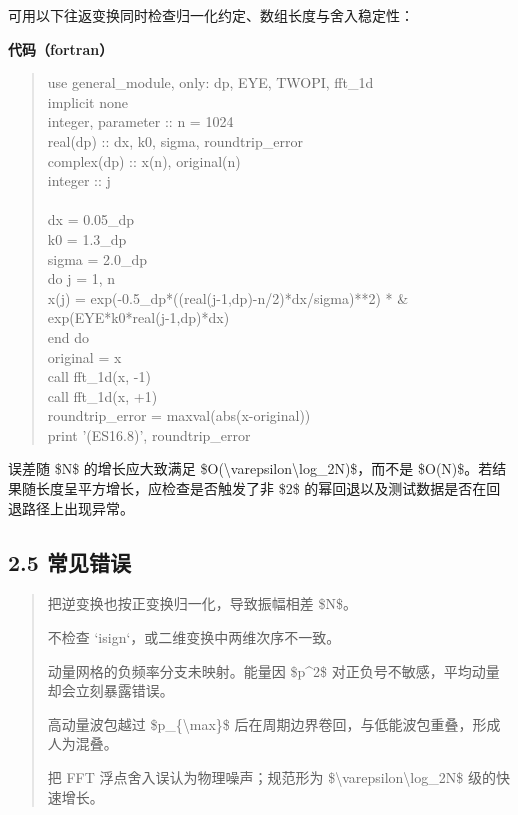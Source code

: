 \documentclass[UTF8,openany,11pt,fontset=fandol]{ctexbook}
\begin{document}
可用以下往返变换同时检查归一化约定、数组长度与舍入稳定性：

\textbf{代码（fortran）}

\begin{quote}
use general\_module, only: dp, EYE, TWOPI, fft\_1d\\
implicit none\\
integer, parameter :: n = 1024\\
real(dp) :: dx, k0, sigma, roundtrip\_error\\
complex(dp) :: x(n), original(n)\\
integer :: j\\
~\\
dx = 0.05\_dp\\
k0 = 1.3\_dp\\
sigma = 2.0\_dp\\
do j = 1, n\\
x(j) = exp(-0.5\_dp*((real(j-1,dp)-n/2)*dx/sigma)**2) * \&\\
exp(EYE*k0*real(j-1,dp)*dx)\\
end do\\
original = x\\
call fft\_1d(x, -1)\\
call fft\_1d(x, +1)\\
roundtrip\_error = maxval(abs(x-original))\\
print '(ES16.8)', roundtrip\_error
\end{quote}

误差随 \$N\$ 的增长应大致满足
\$O(\textbackslash varepsilon\textbackslash log\_2N)\$，而不是
\$O(N)\$。若结果随长度呈平方增长，应检查是否触发了非 \$2\$
的幂回退以及测试数据是否在回退路径上出现异常。

\subsection{\texorpdfstring{\textbf{2.5
常见错误}}{2.5 常见错误}}\label{ux5e38ux89c1ux9519ux8bef-1}

\begin{quote}
把逆变换也按正变换归一化，导致振幅相差 \$N\$。

不检查 `isign`，或二维变换中两维次序不一致。

动量网格的负频率分支未映射。能量因 \$p\^{}2\$
对正负号不敏感，平均动量却会立刻暴露错误。

高动量波包越过 \$p\_\{\textbackslash max\}\$
后在周期边界卷回，与低能波包重叠，形成人为混叠。

把 FFT 浮点舍入误认为物理噪声；规范形为
\$\textbackslash varepsilon\textbackslash log\_2N\$ 级的快速增长。
\end{quote}
\end{document}
